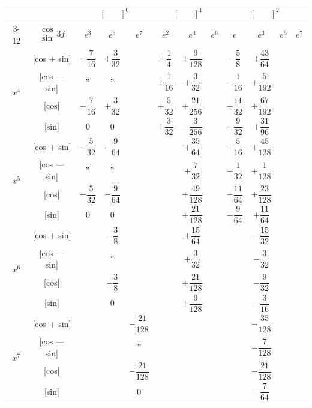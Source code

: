 \documentclass[11pt,a4paper]{book}
\begin{document}
\newpage


\begin{center}
\small
\begin{tabular}{|c|c|c|c|c|c|c|c|c|c|c|c|}
\hline
& & \multicolumn{3}{c|}{$[\phantom{()}]^0$} & \multicolumn{3}{c|}{$[\phantom{()}]^1$} & \multicolumn{4}{c|}{$[\phantom{()}]^2$} \\
\cline{3-12}
& $\begin{smallmatrix} \cos \\ \sin \end{smallmatrix} 3f$ & $e^3$ & $e^5$ & $e^7$ & $e^2$ & $e^4$ & $e^6$ & $e$ & $e^3$ & $e^5$ & $e^7$ \\
\hline
\multirow{4}{*}{$x^4$} & [cos + sin] & $-\dfrac{7}{16}$ & $+\dfrac{3}{32}$ & & $+\dfrac{1}{4}$ & $+\dfrac{9}{128}$ & & $-\dfrac{5}{8}$ & $+\dfrac{43}{64}$ \\
& [cos --- sin] & $"$ & $"$ & & $+\dfrac{1}{16}$ & $+\dfrac{3}{32}$ & & $-\dfrac{1}{16}$ & $+\dfrac{5}{192}$ \\
& [cos] & $-\dfrac{7}{16}$ & $+\dfrac{3}{32}$ & & $+\dfrac{5}{32}$ & $+\dfrac{21}{256}$ & & $-\dfrac{11}{32}$ & $+\dfrac{67}{192}$ \\
& [sin] & $0$ & $0$ & & $+\dfrac{3}{32}$ & $-\dfrac{3}{256}$ & & $-\dfrac{9}{32}$ & $+\dfrac{31}{96}$ \\
\hline
\multirow{4}{*}{$x^5$} & [cos + sin] & $-\dfrac{5}{32}$ & $-\dfrac{9}{64}$ & & & $+\dfrac{35}{64}$ & & $-\dfrac{5}{16}$ & $+\dfrac{45}{128}$ \\
& [cos --- sin] & $"$ & $"$ & & & $+\dfrac{7}{32}$ & & $-\dfrac{1}{32}$ & $+\dfrac{1}{128}$ \\
& [cos] & $-\dfrac{5}{32}$ & $-\dfrac{9}{64}$ & & & $+\dfrac{49}{128}$ & & $-\dfrac{11}{64}$ & $+\dfrac{23}{128}$ \\
& [sin] & $0$ & $0$ & & & $+\dfrac{21}{128}$ & & $-\dfrac{9}{64}$ & $+\dfrac{11}{64}$ \\
\hline
\multirow{4}{*}{$x^6$} & [cos + sin] & & $-\dfrac{3}{8}$ & & & $+\dfrac{15}{64}$ & & & $-\dfrac{15}{32}$ \\
& [cos --- sin] & & $"$ & & & $+\dfrac{3}{32}$ & & & $-\dfrac{3}{32}$ \\
& [cos] & & $-\dfrac{3}{8}$ & & & $+\dfrac{21}{128}$ & & & $-\dfrac{9}{32}$ \\
& [sin] & & $0$ & & & $+\dfrac{9}{128}$ & & & $-\dfrac{3}{16}$ \\
\hline
\multirow{4}{*}{$x^7$} & [cos + sin] & & & $-\dfrac{21}{128}$ & & & & & $-\dfrac{35}{128}$ \\
& [cos --- sin] & & & $"$ & & & & & $-\dfrac{7}{128}$ \\
& [cos] & & & $-\dfrac{21}{128}$ & & & & & $-\dfrac{21}{128}$ \\
& [sin] & & & $0$ & & & & & $-\dfrac{7}{64}$ \\
\hline
\end{tabular}
\end{center}
\end{document}
